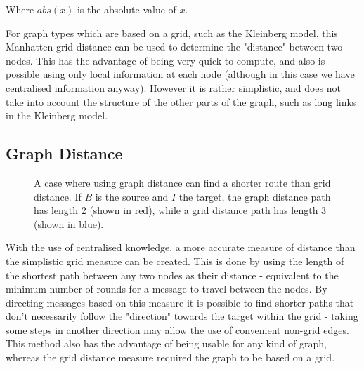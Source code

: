 \documentclass[bsc,frontabs,twoside,singlespacing,parskip,deptreport]{infthesis}     %
\begin{document}
Where $abs(x)$ is the absolute value of $x$.

For graph types which are based on a grid, such as the Kleinberg model, this Manhatten grid distance can be used to determine the "distance" between two nodes. This has the advantage of being very quick to compute, and also is possible using only local information at each node (although in this case we have centralised information anyway). However it is rather simplistic, and does not take into account the structure of the other parts of the graph, such as long links in the Kleinberg model.


\subsection{Graph Distance} \label{subsec:graph_dist}

\begin{figure}
\centering
{}
\caption{A case where using graph distance can find a shorter route than grid distance. If $B$ is the source and $I$ the target, the graph distance path has length 2 (shown in red), while a grid distance path has length 3 (shown in blue).}
\label{fig:graph_dist_example}
\end{figure}

With the use of centralised knowledge, a more accurate measure of distance than the simplistic grid measure can be created. This is done by using the length of the shortest path between any two nodes as their distance - equivalent to the minimum number of rounds for a message to travel between the nodes. By directing messages based on this measure it is possible to find shorter paths that don't necessarily follow the "direction" towards the target within the grid - taking some steps in another direction may allow the use of convenient non-grid edges. This method also has the advantage of being usable for any kind of graph, whereas the grid distance measure required the graph to be based on a grid.
\end{document}
